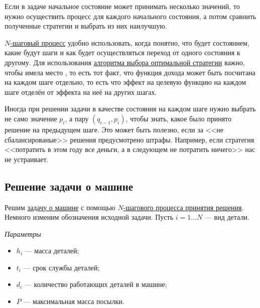 Если в задаче начальное состояние может принимать несколько значений, то нужно осуществить процесс для каждого начального состояния, а потом сравнить полученные стратегии и выбрать из них наилучшую.

\remark

\hyperref[def:n_step_process]{$N$-шаговый процесс} удобно использовать, когда понятно, что будет состоянием, какие будут шаги и как будет осуществляться переход от одного состояния к другому. Для использования \hyperref[def:n_step_process]{алгоритма выбора оптимальной стратегии} важно, чтобы имела место , то есть тот факт, что функция дохода может быть посчитана на каждом шаге отдельно, то есть что эффект на целевую функцию на каждом шаге отделён от эффекта на неё на других шагах.

\remark

Иногда при решении задачи в качестве состояния на каждом шаге нужно выбрать не само значение $p_i$, а пару $(q_{i-1}, p_i)$, чтобы знать, какое было принято решение на предыдущем шаге. Это может быть полезно, если за <<не сбалансированые>> решения предусмотрено штрафы. Например, если стратегия <<потратить в этом году все деньги, а в следующем не потратить ничего>> нас не устраивает.

\subsection{Решение задачи о машине}


Решим \hyperref[pr:car_on_island]{задачу о машине} с помощью \hyperref[def:n_step_process]{$N$-шагового процесса принятия решения}. Немного изменим обозначения исходной задачи. Пусть $i = 1 \dots N$ --- вид детали.

\bigskip

\textit{Параметры}

\begin{itemize}[nosep]
	\item $h_i$ --- масса деталей;
	
	\item $t_i$ --- срок службы деталей;
	
	\item $d_i$ --- количество работающих деталей в машине;
	
	\item $P$ --- максимальная масса посылки.
\end{itemize}

